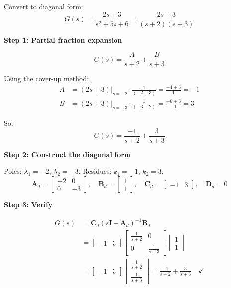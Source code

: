 \begin{example}
\label{ex:diagonal_form}
Convert to diagonal form:
\begin{equation}
G(s) = \frac{2s + 3}{s^2 + 5s + 6} = \frac{2s + 3}{(s+2)(s+3)}
\end{equation}

\textbf{Step 1: Partial fraction expansion}

\begin{equation}
G(s) = \frac{A}{s+2} + \frac{B}{s+3}
\end{equation}

Using the cover-up method:
\begin{align}
A &= \left.(2s + 3)\right|_{s=-2} \cdot \frac{1}{(-2+3)} = \frac{-4+3}{1} = -1 \\
B &= \left.(2s + 3)\right|_{s=-3} \cdot \frac{1}{(-3+2)} = \frac{-6+3}{-1} = 3
\end{align}

So:
\begin{equation}
G(s) = \frac{-1}{s+2} + \frac{3}{s+3}
\end{equation}

\textbf{Step 2: Construct the diagonal form}

Poles: $\lambda_1 = -2$, $\lambda_2 = -3$. Residues: $k_1 = -1$, $k_2 = 3$.
\begin{equation}
\mathbf{A}_d = \begin{bmatrix} -2 & 0 \\ 0 & -3 \end{bmatrix}, \quad
\mathbf{B}_d = \begin{bmatrix} 1 \\ 1 \end{bmatrix}, \quad
\mathbf{C}_d = \begin{bmatrix} -1 & 3 \end{bmatrix}, \quad
\mathbf{D}_d = 0
\end{equation}

\textbf{Step 3: Verify}

\begin{align}
G(s) &= \mathbf{C}_d(s\mathbf{I} - \mathbf{A}_d)^{-1}\mathbf{B}_d \\
&= \begin{bmatrix} -1 & 3 \end{bmatrix} \begin{bmatrix} \frac{1}{s+2} & 0 \\ 0 & \frac{1}{s+3} \end{bmatrix} \begin{bmatrix} 1 \\ 1 \end{bmatrix} \\
&= \begin{bmatrix} -1 & 3 \end{bmatrix} \begin{bmatrix} \frac{1}{s+2} \\ \frac{1}{s+3} \end{bmatrix} = \frac{-1}{s+2} + \frac{3}{s+3} \quad \checkmark
\end{align}
\end{example}

